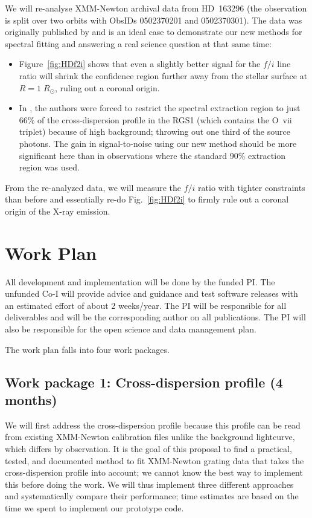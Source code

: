 \documentclass[fleqn,12pt,onecolumn]{SelfArx} %
\begin{document}
We will re-analyse XMM-Newton archival data from HD~163296 (the observation is split over two orbits with ObsIDs 0502370201 and 0502370301). The data was originally published by \cite{2009A&A...494.1041G} and is an ideal case to demonstrate our new methods for spectral fitting and answering a real science question at that same time:
\begin{itemize}
    \item Figure~\ref{fig:HDf2i} shows that even a slightly better signal for the $f/i$ line ratio will shrink the confidence region further away from the stellar surface at $R=1\;R_\odot$, ruling out a coronal origin.
    \item In \cite{2009A&A...494.1041G}, the authors were forced to restrict the spectral extraction region to just 66\% of the cross-dispersion profile in the RGS1 (which contains the O~{\sc vii} triplet) because of high background; throwing out one third of the source photons. The gain in signal-to-noise using our new method should be more significant here than in observations where the standard 90\% extraction region was used.
\end{itemize}

From the re-analyzed data, we will measure the $f/i$ ratio with tighter constraints than before and essentially re-do Fig.~\ref{fig:HDf2i} to firmly rule out a coronal origin of the X-ray emission.


\section{Work Plan}
All development and implementation will be done by the funded PI. The unfunded Co-I will provide advice and guidance and test software releases with an estimated effort of about 2 weeks/year. The PI will be responsible for all deliverables and will be the corresponding author on all publications. The PI will also be responsible for the open science and data management plan.

The work plan falls into four work packages.

\subsection{Work package 1: Cross-dispersion profile (4 months)}

We will first address the cross-dispersion profile because this profile can be read from existing XMM-Newton calibration files unlike the background lightcurve, which differs by observation. It is the goal of this proposal to find a practical, tested, and documented method to fit XMM-Newton grating data that takes the cross-dispersion profile into account; we cannot know the best way to implement this before doing the work. We will thus implement three different approaches and systematically compare their performance; time estimates are based on the time we spent to implement our prototype code.
\end{document}
